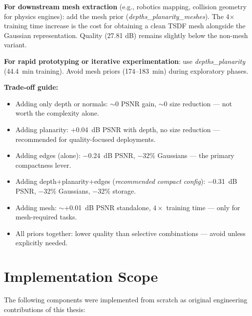 \textbf{For downstream mesh extraction} (e.g., robotics mapping, collision geometry for physics engines): add the mesh prior (\textit{depths\_\allowbreak planarity\_\allowbreak meshes}). The 4$\times$ training time increase is the cost for obtaining a clean TSDF mesh alongside the Gaussian representation. Quality (27.81 dB) remains slightly below the non-mesh variant.

\textbf{For rapid prototyping or iterative experimentation}: use \textit{depths\_\allowbreak planarity} (44.4~min training). Avoid mesh priors (174--183~min) during exploratory phases.

\textbf{Trade-off guide:}
\begin{itemize}
    \item Adding only depth or normals: $\sim$0 PSNR gain, $\sim$0 size reduction — not worth the complexity alone.
    \item Adding planarity: +0.04~dB PSNR with depth, no size reduction — recommended for quality-focused deployments.
    \item Adding edges (alone): $-$0.24~dB PSNR, $-$32\% Gaussians — the primary compactness lever.
    \item Adding depth+planarity+edges (\textit{recommended compact config}): $-$0.31~dB PSNR, $-$32\% Gaussians, $-$32\% storage.
    \item Adding mesh: $\sim$+0.01~dB PSNR standalone, $4\times$ training time — only for mesh-required tasks.
    \item All priors together: lower quality than selective combinations — avoid unless explicitly needed.
\end{itemize}

\section{Implementation Scope}

The following components were implemented from scratch as original engineering contributions of this thesis:


